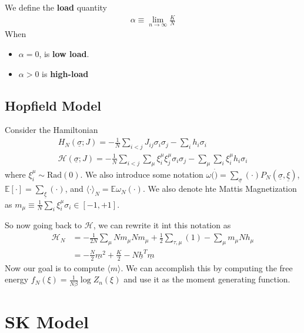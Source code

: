 \begin{definition} [Load] We define the \textbf{load} quantity
	\begin{align}
		\alpha \equiv \lim_{n \to \infty} \frac{K}{N}
	\end{align}When 
	\begin{itemize}
		\item $\alpha = 0$, is \textbf{low load}. 
		\item $\alpha > 0$ is \textbf{high-load}
	\end{itemize}
\end{definition}

\subsection{Hopfield Model} 
Consider the Hamiltonian
\begin{align}
	H_N(\underline \sigma; J) = - \frac{1}{N} \sum_{i < j} J_{ij} \sigma_i \sigma_j - \sum_i h_i \sigma_i\\
	\mathcal H (\underline \sigma; J) = - \frac{1}{N} \sum_{i < j} \sum_\mu \xi_i^\mu \xi_j^\mu \sigma_i \sigma_j - \sum_\mu \sum_i \xi_i^\mu h_i \sigma_i
\end{align}
where $\xi_i^\mu \sim \text{Rad}(0)$. We also introduce some notation $\omega(\dot) = \sum_{\underline \sigma} (\cdot) P_N(\underline \sigma, \underline \xi)$, $\mathbb E[\cdot] = \sum_{\underline \xi}(\cdot)$, and $\langle \cdot \rangle _N = \mathbb E \omega_N(\cdot)$. We also denote hte Mattis Magnetization as $m_\mu \equiv \frac{1}{N} \sum_i \xi_i^\mu \sigma_i \in [-1, +1]$.

So now going back to $\mathcal H$, we can rewrite it int this notation as
\begin{align}
	\mathcal H_N & = - \frac{1}{2N} \sum_{\mu} N m_\mu N m_\mu + \frac{1}{2} \sum_{\tau, \mu} (1) - \sum_\mu m_\mu N h_\mu\\
	& = - \frac{N}{2} \underline m^2 + \frac{K}{2} - N \underline h^T \underline m
\end{align}
Now our goal is to compute $\langle m \rangle$. We can accomplish this by computing the free energy $f_N(\xi) = \frac{1}{N\beta} \log Z_n(\xi)$ and use it as the moment generating function.


\section{SK Model}






